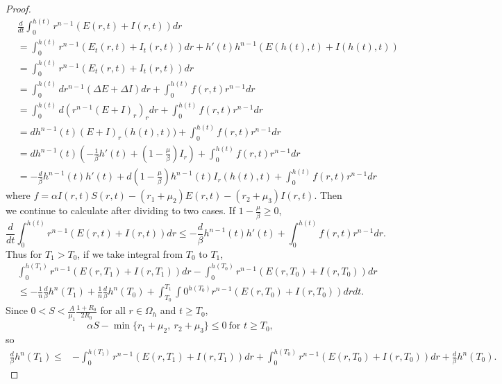 \documentclass[11pt]{amsart}
\numberwithin{equation}{section}
\theoremstyle{plain}
\theoremstyle{definition}
\begin{document}
\begin{proof}
	\begin{equation*}
	\begin{aligned}
		&\frac{d}{dt} \int_0^{h(t)}r^{n-1}(E(r,t)+I(r,t))dr\\
		&=\int_0^{h(t)}r^{n-1}(E_t(r,t)+I_t(r,t))dr+h'(t)h^{n-1}\left(E(h(t),t)+I(h(t),t)\right)\\
		&=\int_0^{h(t)}r^{n-1}(E_t(r,t)+I_t(r,t))dr\\
		&=\int_0^{h(t)}dr^{n-1}(\Delta E+\Delta I)dr+\int_0^{h(t)}f(r,t)r^{n-1}dr\\
		&=\int_0^{h(t)}d(r^{n-1}(E+I)_r)_rdr+\int_0^{h(t)}f(r,t)r^{n-1}dr\\
		&=dh^{n-1}(t)(E+I)_r(h(t),t))+\int_0^{h(t)}f(r,t)r^{n-1}dr\\
		&=dh^{n-1}(t)\left(-\frac{1}{\beta}h'(t)+\left(1-\frac{\mu}{\beta}\right)I_r\right)+\int_0^{h(t)}f(r,t)r^{n-1}dr\\
		&=-\frac{d}{\beta}h^{n-1}(t)h'(t)+d\left(1-\frac{\mu}{\beta}\right)h^{n-1}(t)I_r(h(t),t)+\int_0^{h(t)}f(r,t)r^{n-1}dr
	\end{aligned}
	\end{equation*}
	where $f=\alpha I(r,t)S(r,t)-(r_1+\mu_2)E(r,t)-(r_2+\mu_3)I(r,t)$.
	Then we continue to calculate after dividing to two cases. If $1-\frac{\mu}{\beta} \geq 0$,
	\begin{equation*}
		\frac{d}{dt} \int_0^{h(t)}r^{n-1}(E(r,t)+I(r,t))dr\leq-\frac{d}{\beta}h^{n-1}(t)h'(t)+\int_0^{h(t)}f(r,t)r^{n-1}dr.
	\end{equation*}
	Thus for $T_1>T_0$, if we take integral from $T_0$ to $T_1$,
	\begin{equation*}
		\begin{aligned}
			&\int_0^{h(T_1)}r^{n-1}(E(r,T_1)+I(r,T_1))dr-\int_0^{h(T_0)}r^{n-1}(E(r,T_0)+I(r,T_0))dr\\
			&\leq-\frac{1}{n}\frac{d}{\beta}h^n(T_1)+\frac{1}{n}\frac{d}{\beta}h^n(T_0)+\int_{T_0}^{T_1}\int0^{h(T_0)}r^{n-1}(E(r,T_0)+I(r,T_0))drdt.
		\end{aligned}
	\end{equation*}
	Since $0<S<\frac{A}{\mu_1}\frac{1+R_0}{2R_0}$ for all $r \in \Omega_h$ and $t\geq T_0$,
	\begin{equation*}
		\alpha S-\min\{r_1+\mu_2,\ r_2+\mu_3\}\leq0 \ \text{for } t\geq T_0,
	\end{equation*}
	so
	\begin{equation*}
		\begin{aligned}
			\frac{d}{\beta}h^n(T_1)\leq&-\int_0^{h(T_1)}r^{n-1}(E(r,T_1)+I(r,T_1))dr+\int_0^{h(T_0)}r^{n-1}(E(r,T_0)+I(r,T_0))dr+\frac{d}{\beta}h^n(T_0).

\end{aligned}
\end{equation*}
\end{proof}
\end{document}
